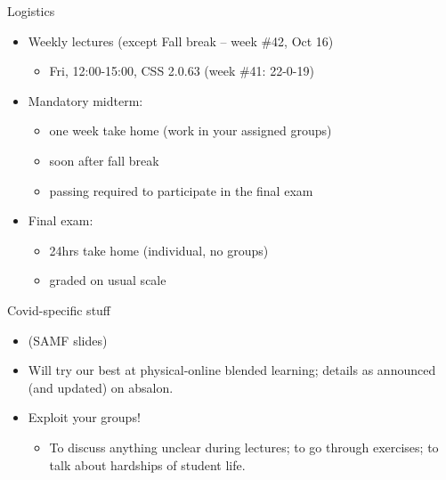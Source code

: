 \documentclass[english,10pt
,aspectratio=169
]{beamer}
\begin{document}
\begin{frame}{Logistics}
\begin{itemize}
	\item Weekly lectures (except Fall break -- week \#42, Oct 16)
	\begin{itemize}
		\item Fri, 12:00-15:00, CSS 2.0.63 (week \#41: 22-0-19)
	\end{itemize}
	
	\pause
	\item Mandatory midterm:
	\begin{itemize}
		\item one week take home (work in your assigned groups)
		\item soon after fall break
		\item passing required to participate in the final exam
	\end{itemize}
	
	\item Final exam:
	\begin{itemize}
		\item 24hrs take home (individual, no groups)
		\item graded on usual scale
	\end{itemize}
\end{itemize}
\end{frame}


\begin{frame}{Covid-specific stuff}
	\begin{itemize}
		\item (SAMF slides)
		\item Will try our best at physical-online blended learning; details as announced (and updated) on absalon.
		\item Exploit your groups!
		\begin{itemize}
			\item To discuss anything unclear during lectures; to go through exercises; to talk about hardships of student life.
		\end{itemize}
	\end{itemize}
\end{frame}
\end{document}

